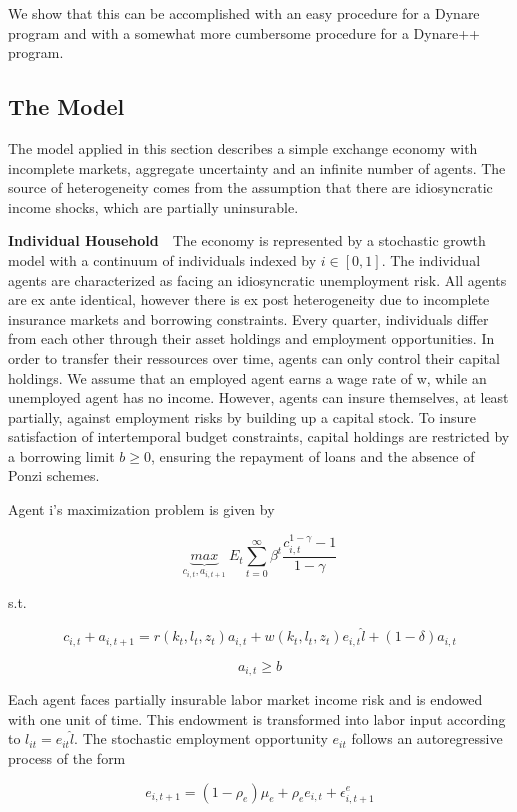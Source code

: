 \documentclass[cn,10pt,math=newtx,citestyle=gb7714-2015,bibstyle=gb7714-2015]{elegantbook}
\begin{document}
	We show that this can be accomplished with an easy procedure for a Dynare program and with a somewhat more cumbersome procedure for a Dynare++ program.
	
	\subsection{The Model}
	
	The model applied in this section describes a simple exchange economy with incomplete markets, aggregate uncertainty and an infinite number of agents. The source of heterogeneity comes from the assumption that there are idiosyncratic income shocks, which are partially uninsurable.
	
	\textbf{Individual Household}~~The economy is represented by a stochastic growth model with a continuum of individuals indexed by $i\in [0,1]$. The individual agents are characterized as facing an idiosyncratic unemployment risk. All agents are ex ante identical, however there is ex post heterogeneity due to incomplete insurance markets and borrowing constraints. Every quarter, individuals differ from each other through their asset holdings and employment opportunities. In order to transfer their ressources over time, agents can only control their capital holdings. We assume that an employed agent earns a wage rate of w, while an unemployed agent has no income. However, agents can insure themselves, at least partially,
	against employment risks by building up a capital stock. To insure satisfaction of intertemporal budget constraints, capital holdings are restricted by a borrowing limit $b \ge 0$, ensuring the repayment of loans and the absence of Ponzi schemes.
	
	Agent i’s maximization problem is given by
	
	$$\underbrace{max}_{c_{i,t},a_{i,t+1}}~E_t\sum_{t=0}^{\infty}\beta^{t}\frac{c_{i,t}^{1-\gamma}-1}{1-\gamma}$$
	
	s.t.
	
	$$c_{i,t}+a_{i,t+1}=r(k_t,l_t,z_t)a_{i,t}+w(k_t,l_t,z_t)e_{i,t}\hat{l}+(1-\delta)a_{i,t}$$
	
	$$a_{i,t}\ge b$$
	
	Each agent faces partially insurable labor market income risk and is endowed with one unit of time. This endowment is transformed into labor input according to $l_{it} = e_{it}\hat{l}$. The stochastic employment opportunity $e_{it}$ follows an autoregressive process of the form
	
	$$e_{i,t+1}=(1-\rho_e)\mu_e+\rho_ee_{i,t}+\epsilon_{i,t+1}^e$$
	
\end{document}
